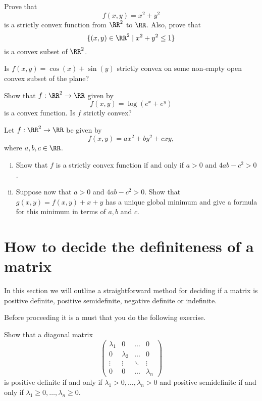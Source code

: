 \documentclass{article}
\begin{document}
\beginshex
  Prove that
  \begin{equation*}
    f(x, y) = x^2 + y^2
  \end{equation*}
  is a strictly convex function from $\RR^2$ to $\RR$. Also, prove that
  $$
  \{(x, y)\in \RR^2 \mid x^2 + y^2 \leq 1\}
  $$
  is a convex subset of $\RR^2$.
  \endshex

\beginshex
  Is $f(x, y) = \cos(x) + \sin(y)$ strictly convex on some non-empty
  open convex subset of the plane?
\endshex


\beginshex
 Show that $f:\RR^2 \rightarrow \RR$ given by
  \begin{equation*}
    f(x, y) = \log(e^x + e^y)
  \end{equation*}
  is a convex function. Is $f$ strictly convex?
\endshex

\beginshex
Let $f:\RR^2\rightarrow \RR$ be given by
  \begin{equation*}
    f(x, y) = a x^2 + b y^2 + c x y,
  \end{equation*}
  where $a, b, c\in \RR$.

  \begin{enumerate}[(i)]
  \item Show that $f$ is a strictly convex function if and only if $a > 0$
    and $4 a b - c^2 > 0$.
  \item Suppose now that $a > 0$ and $4 a b - c^2>0$.  Show that $g(x,
    y) = f(x, y) + x + y$ has a unique global minimum and give a
    formula for this minimum in terms of $a, b$ and $c$.
\end{enumerate}
\endshex



\section{How to decide the definiteness of a matrix}

In this section we will outline a straightforward method for
deciding if a matrix is positive definite, positive semidefinite,
negative definite or indefinite.

Before proceeding it is a must that you do the following exercise.

\beginshex
Show that a diagonal matrix
$$
\begin{pmatrix}
  \lambda_1 & 0 & \dots & 0\\
  0 &\lambda_2 & \dots &0\\
  \vdots & \vdots & \ddots & \vdots\\
  0 & 0 &\dots & \lambda_n
\end{pmatrix}
$$
is positive definite if and only if $\lambda_1 > 0, \dots, \lambda_n > 0$
and positive semidefinite
if and only if $\lambda_1 \geq  0, \dots, \lambda_n \geq 0$.
\end{document}

